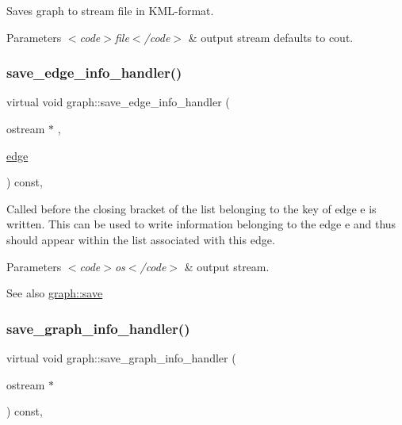 Saves graph to stream {\ttfamily file} in K\+M\+L-\/format.


\begin{DoxyParams}{Parameters}
{\em $<$code$>$file$<$/code$>$} & output stream defaults to cout. \\
\hline
\end{DoxyParams}
\mbox{\label{classgraph_ad66769013784410f3ff54aac579350b5}} 
\subsubsection{\texorpdfstring{save\+\_\+edge\+\_\+info\+\_\+handler()}{save\_edge\_info\_handler()}}
{\footnotesize\ttfamily virtual void graph\+::save\+\_\+edge\+\_\+info\+\_\+handler (\begin{DoxyParamCaption}\item[{ostream $\ast$}]{,  }\item[{\mbox{\hyperlink{classedge}{edge}}}]{ }\end{DoxyParamCaption}) const\hspace{0.3cm}{\ttfamily [inline]}, {\ttfamily [virtual]}}

Called before the closing bracket of the list belonging to the key of edge {\ttfamily e} is written. This can be used to write information belonging to the edge {\ttfamily e} and thus should appear within the list associated with this edge.


\begin{DoxyParams}{Parameters}
{\em $<$code$>$os$<$/code$>$} & output stream. \\
\hline
\end{DoxyParams}
\begin{DoxySeeAlso}{See also}
\mbox{\hyperlink{classgraph_a7bd0712a528249d1585085a64ac3e661}{graph\+::save}} 
\end{DoxySeeAlso}
\mbox{\label{classgraph_a09d33566f9444f6aabab5c2238aaf760}} 
\subsubsection{\texorpdfstring{save\+\_\+graph\+\_\+info\+\_\+handler()}{save\_graph\_info\_handler()}}
{\footnotesize\ttfamily virtual void graph\+::save\+\_\+graph\+\_\+info\+\_\+handler (\begin{DoxyParamCaption}\item[{ostream $\ast$}]{ }\end{DoxyParamCaption}) const\hspace{0.3cm}{\ttfamily [inline]}, {\ttfamily [virtual]}}

